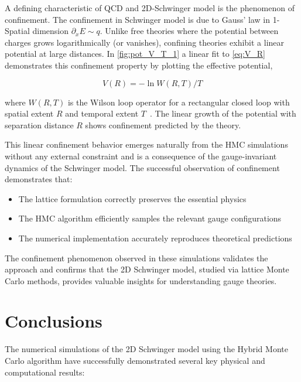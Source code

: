 A defining characteristic of QCD and 2D-Schwinger model is the phenomenon of confinement. 
The confinement in Schwinger model is due to Gauss' law in 1-Spatial dimension $\partial_x E \sim q$.
Unlike free theories where the potential between charges grows logarithmically (or vanishes), confining theories exhibit a linear potential at large distances. 
In \cref{fig:pot_V_T_1} a linear fit to \cref{eq:V_R} demonstrates this confinement property by plotting the effective potential,

\begin{equation}
    \label{eq:V_R}
    V(R) = -\ln W(R,T) / T
\end{equation}

where $W(R,T)$ is the Wilson loop operator for a rectangular closed loop with spatial extent $R$ and temporal extent $T$~\cite{lecturenote}. 
The linear growth of the potential with separation distance $R$ shows confinement predicted by the theory.

This linear confinement behavior emerges naturally from the HMC simulations without any external constraint and is a consequence of the gauge-invariant 
dynamics of the Schwinger model. The successful observation of confinement demonstrates that:
\begin{itemize}
    \item The lattice formulation correctly preserves the essential physics
    \item The HMC algorithm efficiently samples the relevant gauge configurations
    \item The numerical implementation accurately reproduces theoretical predictions
\end{itemize}

The confinement phenomenon observed in these simulations validates the approach and confirms that the 2D Schwinger model, 
studied via lattice Monte Carlo methods, provides valuable insights for understanding gauge theories.

\newpage

\section{Conclusions}

The numerical simulations of the 2D Schwinger model using the Hybrid Monte Carlo algorithm have successfully demonstrated several key physical and computational results:

